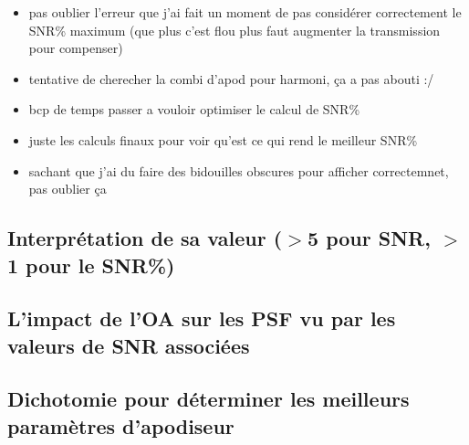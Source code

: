 \begin{itemize}[label=\textendash]
    \item pas oublier l’erreur que j’ai fait un moment de pas considérer correctement le SNR\% maximum (que plus c’est flou plus faut augmenter la transmission pour compenser)
    \item tentative de cherecher la combi d’apod pour harmoni, ça a pas abouti :/
    \item bcp de temps passer a vouloir optimiser le calcul de SNR\%
    \item juste les calculs finaux pour voir qu’est ce qui rend le meilleur SNR\%
    \item sachant que j’ai du faire des bidouilles obscures pour afficher correctemnet, pas oublier ça
\end{itemize}

\subsection{Interprétation de sa valeur ($>$5 pour SNR, $>$1 pour le SNR\%)}

\subsection{L’impact de l’OA sur les PSF vu par les valeurs de SNR associées}

\subsection{Dichotomie pour déterminer les meilleurs paramètres d’apodiseur}
